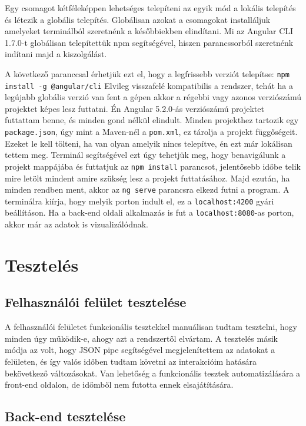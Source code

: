 Egy csomagot kétféleképpen  lehetséges telepíteni az egyik mód a lokális telepítés és létezik a globális telepítés. Globálisan azokat a csomagokat installáljuk amelyeket terminálból szeretnénk a későbbiekben elindítani.
Mi az Angular CLI 1.7.0-t globálisan telepítettük npm segítségével, hiszen parancssorból szeretnénk indítani majd a kiszolgálást.

A következő paranccsal érhetjük ezt el, hogy a legfrissebb verziót telepítse: \texttt{npm install -g @angular/cli}
Elvileg visszafelé kompatibilis a rendszer, tehát ha a legújabb globális verzió van fent a gépen akkor a régebbi vagy azonos verziószámú projektet képes lesz futtatni. Én Angular 5.2.0-ás verziószámú projektet futtattam benne, és minden gond nélkül elindult.
Minden projekthez tartozik egy \texttt{package.json}, úgy mint a Maven-nél a \texttt{pom.xml}, ez tárolja a projekt függőségeit. Ezeket le kell tölteni, ha van olyan amelyik nincs telepítve, én ezt már lokálisan tettem meg. Terminál segítségével ezt úgy tehetjük meg, hogy benavigálunk a projekt mappájába és futtatjuk az \texttt{npm install} parancsot, jelentősebb időbe telik mire letölt mindent amire szükség lesz a projekt futtatásához. Majd ezután, ha minden rendben ment, akkor az \texttt{ng serve} parancsra elkezd futni a program. A terminálra kiírja, hogy melyik porton indult el, ez a \texttt{localhost:4200} gyári beállításon. Ha a back-end oldali alkalmazás is fut a \texttt{localhost:8080}-as porton, akkor már az adatok is vizualizálódnak.

\section{Tesztelés}

\subsection{Felhasználói felület tesztelése}
A felhasználói felületet funkcionális tesztekkel manuálisan tudtam tesztelni, hogy minden úgy működik-e, ahogy azt a rendszertől elvártam. A tesztelés másik módja az volt, hogy JSON pipe segítségével megjelenítettem az adatokat a felületen, és így valós időben tudtam követni az interakcióim hatására bekövetkező változásokat. Van lehetőség a funkcionális tesztek automatizálására a front-end oldalon, de időmből nem futotta ennek elsajátítására.

\subsection{Back-end tesztelése}


